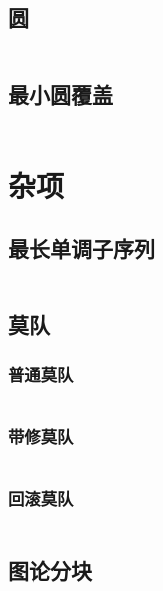 \documentclass[utf8]{ctexart}
\newcommand{\cpp}[1]{\inputminted[linenos,breaklines,tabsize=4,mathescape]{c++}{#1}}
\begin{document}
\subsection{圆}
\cpp{codes/computational-geometry/circle.cpp}

\subsection{最小圆覆盖}
\cpp{codes/computational-geometry/min-circle-cover.cpp}



\section{杂项}

\subsection{最长单调子序列}
\cpp{codes/misc/lis.cpp}

\subsection{莫队}

\subsubsection{普通莫队}
\cpp{codes/misc/mo.cpp}

\subsubsection{带修莫队}
\cpp{codes/misc/modifiable-mo.cpp}

\subsubsection{回滚莫队}
\cpp{codes/misc/rollback-mo.cpp}

\subsection{图论分块}
\cpp{codes/misc/graph-block.cpp}
\end{document}
